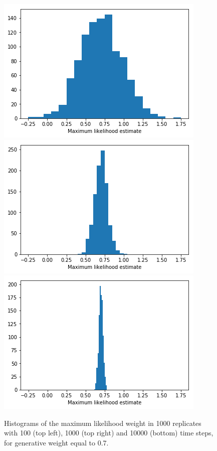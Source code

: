 \begin{figure}[hbt!]
    \centering
    \includegraphics[scale = 0.40]{fig/19_hist_100.png}
    \includegraphics[scale = 0.40]{fig/19_hist_1000.png}
    \includegraphics[scale = 0.40]{fig/19_hist_10000.png}
    \caption{Histograms of the maximum likelihood weight in 1000 replicates with 100 (top left), 1000 (top right) and 10000 (bottom) time steps, for generative weight equal to 0.7.}
    \label{fig:ML_hist}
\end{figure}

